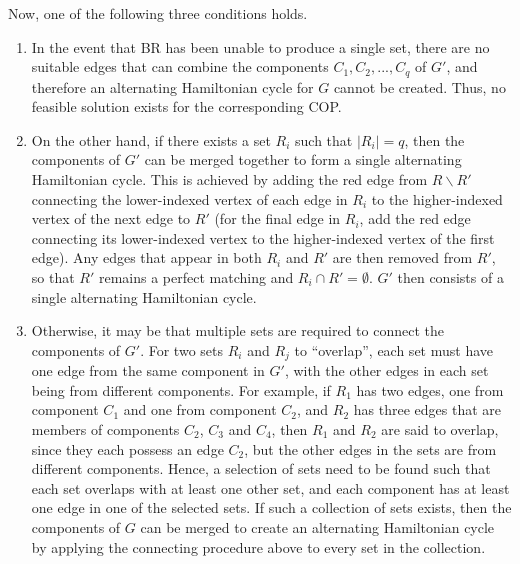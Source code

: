 \documentclass[oribibl]{llncs}
\begin{document}
Now, one of the following three conditions holds.
\begin{enumerate}
\item In the event that BR has been unable to produce a single set, there are no suitable edges that can combine the components $C_1, C_2, ..., C_q$ of $G'$, and therefore an alternating Hamiltonian cycle for $G$ cannot be created. Thus, no feasible solution exists for the corresponding COP.

\item On the other hand, if there exists a set $R_i$ such that $|R_i| = q$, then the components of $G'$ can be merged together to form a single alternating Hamiltonian cycle. This is achieved by adding the red edge from $R\backslash R'$ connecting the lower-indexed vertex of each edge in $R_i$ to the higher-indexed vertex of the next edge to $R'$ (for the final edge in $R_i$, add the red edge connecting its lower-indexed vertex to the higher-indexed vertex of the first edge). Any edges that appear in both $R_i$ and $R'$ are then removed from $R'$, so that $R'$ remains a perfect matching and $R_i \cap R' = \emptyset$. $G'$ then consists of a single alternating Hamiltonian cycle.


\item Otherwise, it may be that multiple sets are required to connect the components of $G'$. For two sets $R_i$ and $R_j$ to ``overlap'', each set must have one edge from the same component in $G'$, with the other edges in each set being from different components. For example, if $R_1$ has two edges, one from component $C_1$ and one from component $C_2$, and $R_2$ has three edges that are members of components $C_2$, $C_3$ and $C_4$, then $R_1$ and $R_2$ are said to overlap, since they each possess an edge $C_2$, but the other edges in the sets are from different components. Hence, a selection of sets need to be found such that each set overlaps with at least one other set, and each component has at least one edge in one of the selected sets. If such a collection of sets exists, then the components of $G$ can be merged to create an alternating Hamiltonian cycle by applying the connecting procedure above to every set in the collection.
\end{enumerate}
\end{document}
